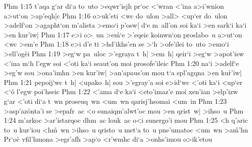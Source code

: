 \vs Phm 1:15
t'aqa
g`ar
di`a
to~uto
>eqwr'isjh
pr`oc
<'wran
<'ina
a>i'wnion
a>ut`on
>ap'eqh|c\bibvsend
\vs Phm 1:16
o>uk'eti
<wc
do~ulon
>all>
<up`er
do~ulon
>adelf`on
>agapht`on
m'alista
>emo`i
p'osw|
d`e
m~all'on
soi
ka`i
>en
sark`i
ka`i
>en
kur'iw|\bibvsend
\vs Phm 1:17
e>i
o>~un
>e\r{m}`e
>'eqeic
koinwn`on
proslabo~u
a>ut`on
<wc
>em'e\bibvsend
\vs Phm 1:18
e>i
d'e
ti
>hd'ikhs'en
se
>`h
>ofe'ilei
to~uto
>emo`i
>ell'og\r{e}i\bibvsend
{}
\vs Phm 1:19
>eg`w
pa~uloc
>'egraya
t~h|
>em~h|
qeir`i
>eg`w
>apot'isw
<'ina
m`h
l'egw
soi
<'oti
ka`i
seaut'on
moi
prosofe'ileic\bibvsend
\vs Phm 1:20
na`i
>adelf`e
>eg'w
sou
>ona'imhn
>en
kur'iw|
>an'apaus'on
mou
t`a
spl'agqna
>en
ku\r{r}'iw|\bibvsend
{}
\vs Phm 1:21
pepoij`wc
t~h|
<upako~h|
sou
>'egray'a
soi
e>id`wc
<'oti
ka`i
<up`er
<`o\r{}
l'egw
poi'hseic\bibvsend
\vs Phm 1:22
<'ama
d`e
ka`i
<eto'imaz'e
moi
xen'ian
>elp'izw
g`ar
<'oti
di`a
t~wn
proseuq~wn
<um~wn
qarisj'hsomai
<um~in\bibvsend
\vs Phm 1:23
>asp'az\r{o}nta'i
se
>epafr~ac
<o
sunaiqm'alwt'oc
mou
>en
qrist~w|
>ihso~u\bibvsend
\vs Phm 1:24
m'arkoc
>ar'istarqoc
dhm~ac
louk~ac
o<i
sunergo'i
mou\bibvsend
\vs Phm 1:25
<h
q'aric
to~u
kur'iou
<h\r{m}~wn
>ihso~u
qristo~u
met`a
to~u
pne'umatoc
<um~wn
>a\r{m}'hn\bibvsend
{}
Pr`oc\r{}
vfil'hmona
>egr'afh
>ap`o
<r'wmhc
di`a
>onhs'imou
o>ik'etou\bibvsend
